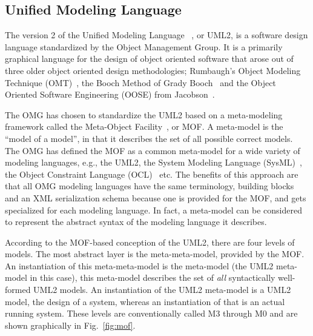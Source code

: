 \subsection{Unified Modeling Language}
The version 2 of the Unified Modeling Language ~\cite{uml-infra,
  uml-super}, or UML2, is a software design language standardized by
the Object Management Group. It is a primarily graphical language for
the design of object oriented software that arose out of three older
object oriented design methodologies; Rumbaugh's Object Modeling
Technique (OMT)~\cite{bruegge@oopsla92}, the Booch Method of Grady
Booch~\cite{white-booch} and the Object Oriented Software Engineering
(OOSE) from Jacobson~\cite{jacobson-oose}.

The OMG has chosen to standardize the UML2 based on a meta-modeling
framework called the Meta-Object Facility~\cite{mof-std}, or MOF. A
meta-model is the ``model of a model'', in that it describes the set
of all possible correct models. The OMG has defined the MOF as a
common meta-model for a wide variety of modeling languages, e.g., the
UML2, the System Modeling Language (SysML)~\cite{sysml}, the Object
Constraint Language (OCL)~\cite{ocl} etc. The benefits of this
approach are that all OMG modeling languages have the same
terminology, building blocks and an XML serialization schema because
one is provided for the MOF, and gets specialized for each modeling
language. In fact, a meta-model can be considered to represent the
abstract syntax of the modeling language it describes.

According to the MOF-based conception of the UML2, there are four
levels of models. The most abstract layer is the meta-meta-model,
provided by the MOF. An instantiation of this meta-meta-model is the
meta-model (the UML2 meta-model in this case), this meta-model
describes the set of \emph{all} syntactically well-formed UML2
models. An instantiation of the UML2 meta-model is a UML2 model, the
design of a system, whereas an instantiation of that is an actual
running system. These levels are conventionally called M3 through M0
and are shown graphically in Fig.~\ref{fig:mof}.

